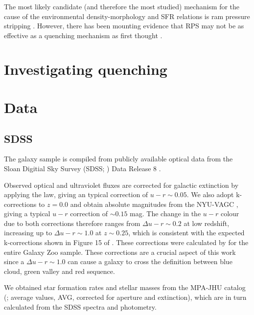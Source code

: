The most likely candidate (and therefore the most studied) mechanism for the cause of the environmental density-morphology and SFR relations is ram pressure stripping \citep[RPS;][]{abadi99, poggianti99}. However, there has been mounting evidence that RPS may not be as effective as a  quenching mechanism as first thought \citep{emerick16, fillingham16}. 

\section{Investigating quenching}\label{sec:invquench}


\section{Data}\label{sec:data}

\subsection{SDSS}\label{sec:sdssintro}

The galaxy sample is compiled from publicly available optical data from the Sloan Digitial Sky Survey (SDSS; \citealt{York00}) Data Release 8 \citep{Aihara11}. 

Observed optical and ultraviolet fluxes are corrected for galactic extinction \citep{Oh11} by applying the \citet*{Cardelli89} law, giving an typical correction of $u-r \sim 0.05$. We also adopt k-corrections to $z=0.0$ and obtain absolute magnitudes from the NYU-VAGC \citep{Blanton05, padmanabhan08, blanton07}, giving a typical $u-r$ correction of $\sim 0.15$ mag. The change in the $u-r$ colour due to both corrections therefore ranges from $\Delta u-r \sim 0.2$ at low redshift, increasing up to $\Delta u-r \sim 1.0$ at $z \sim 0.25$, which is consistent with the expected k-corrections shown in Figure 15 of \citet{blanton07}. These corrections were calculated by \citet{Bamford09} for the entire Galaxy Zoo sample. These corrections are a crucial aspect of this work since a $\Delta u-r \sim 1.0$ can cause a galaxy to cross the definition between blue cloud, green valley and red sequence.

We obtained star formation rates and stellar masses from the MPA-JHU catalog (\citealt{kauffmann03, brinchmann04}; average values, \textsc{AVG}, corrected for aperture and extinction), which are in turn calculated from the SDSS spectra and photometry. 

